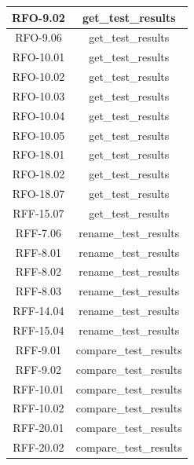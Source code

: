 \begin{tabularx}{\textwidth}{|c|c|}
    \hline
        RFO-9.02 & get\_test\_results\\
    \hline
        RFO-9.06 & get\_test\_results\\
    \hline
        RFO-10.01 & get\_test\_results\\
    \hline
        RFO-10.02 & get\_test\_results\\
    \hline
        RFO-10.03 & get\_test\_results\\
    \hline
        RFO-10.04 & get\_test\_results\\
    \hline
        RFO-10.05 & get\_test\_results\\
    \hline
        RFO-18.01 & get\_test\_results\\
    \hline
        RFO-18.02 & get\_test\_results\\
    \hline
        RFO-18.07 & get\_test\_results\\
    \hline
        RFF-15.07 & get\_test\_results\\
    \hline
        RFF-7.06 & rename\_test\_results\\
    \hline
        RFF-8.01 & rename\_test\_results\\
    \hline
        RFF-8.02 & rename\_test\_results\\
    \hline
        RFF-8.03 & rename\_test\_results\\
    \hline
        RFF-14.04 & rename\_test\_results\\
    \hline
        RFF-15.04 & rename\_test\_results\\
    \hline
        RFF-9.01 & compare\_test\_results\\
    \hline
        RFF-9.02 & compare\_test\_results\\
    \hline
        RFF-10.01 & compare\_test\_results\\
    \hline
        RFF-10.02 & compare\_test\_results\\
    \hline
        RFF-20.01 & compare\_test\_results\\
    \hline
        RFF-20.02 & compare\_test\_results\\
    \hline
    \end{tabularx}